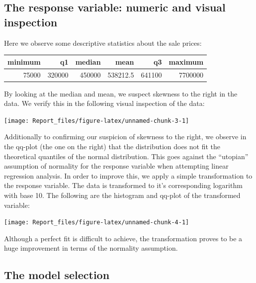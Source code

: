 \documentclass[table]{article}
\begin{document}
\subsection{The response variable: numeric and visual
inspection}\label{the-response-variable-numeric-and-visual-inspection}

Here we observe some descriptive statistics about the sale prices:
\hfill\break

\begin{table}[H]
\centering
\begin{tabular}{r|r|r|r|r|r}
\hline
minimum & q1 & median & mean & q3 & maximum\\
\hline
75000 & 320000 & 450000 & 538212.5 & 641100 & 7700000\\
\hline
\end{tabular}
\end{table}

\hfill\break
By looking at the median and mean, we suspect skewness to the right in
the data. We verify this in the following visual inspection of the data:

\begin{center}\texttt{[image: Report\_files/figure-latex/unnamed-chunk-3-1]} \end{center}

Additionally to confirming our suspicion of skewness to the right, we
observe in the qq-plot (the one on the right) that the distribution does
not fit the theoretical quantiles of the normal distribution. This goes
against the ``utopian'' assumption of normality for the response
variable when attempting linear regression analysis. \newpage
In order to improve this, we apply a simple transformation to the
response variable. The data is transformed to it's corresponding
logarithm with base 10. The following are the histogram and qq-plot of
the transformed variable:

\begin{center}\texttt{[image: Report\_files/figure-latex/unnamed-chunk-4-1]} \end{center}

Although a perfect fit is difficult to achieve, the transformation
proves to be a huge improvement in terms of the normality assumption.

\subsection{The model selection}\label{the-model-selection}
\end{document}

